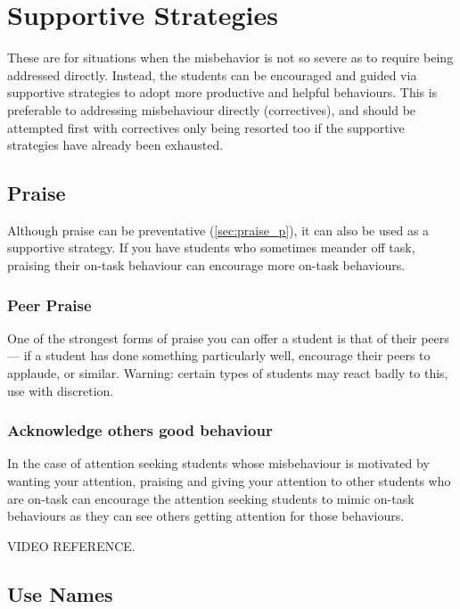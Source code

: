 \documentclass[12pt]{report}
\begin{document}
\chapter{Supportive Strategies}
\label{chap:supportive}

These are for situations when the misbehavior is not so severe as to require being addressed directly. Instead, the students can be encouraged and guided via supportive strategies to adopt more productive and helpful behaviours. This is preferable to addressing misbehaviour directly (correctives), and should be attempted first with correctives only being resorted too if the supportive strategies have already been exhausted.


\section{Praise}
\label{sec:praise_s}

Although praise can be preventative (\ref{sec:praise_p}), it can also be used as a supportive strategy. If you have students who sometimes meander off task, praising their on-task behaviour can encourage more on-task behaviours.  

\subsection{Peer Praise}
\label{sec:peer_praise_s}

One of the strongest forms of praise you can offer a student is that of their peers --- if a student has done something particularly well, encourage their peers to applaude, or similar.
Warning: certain types of students may react badly to this, use with discretion.

\subsection{Acknowledge others good behaviour}
\label{sec:acknowledge_good_behaviour_s}

In the case of attention seeking students whose misbehaviour is motivated by wanting your attention, praising and giving your attention to other students who are on-task can encourage the attention seeking students to mimic on-task behaviours as they can see others getting attention for those behaviours.

VIDEO REFERENCE.



\section{Use Names}
\label{sec:use_names_s}
\end{document}
